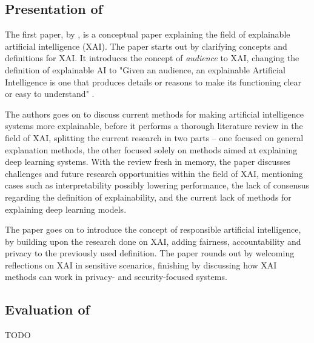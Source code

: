 \subsection[Presentation of Barredo Arrieta et al. (2020)]{Presentation of \textcite{Barredo_2020}}
The first paper,  by \textcite{Barredo_2020}, is a conceptual paper explaining the field of explainable artificial intelligence (XAI). The paper starts out by clarifying concepts and definitions for XAI. It introduces the concept of \textit{audience} to XAI, changing the definition of explainable AI to "Given an audience, an explainable Artificial Intelligence is one that produces details or reasons to make its functioning clear or easy to understand" \parencite[p.85]{Barredo_2020}.

The authors goes on to discuss current methods for making artificial intelligence systems more explainable, before it performs a thorough literature review in the field of XAI, splitting the current research in two parts -- one focused on general explanation methods, the other focused solely on methods aimed at explaining deep learning systems. With the review fresh in memory, the paper discusses challenges and future research opportunities within the field of XAI, mentioning cases such as interpretability possibly lowering performance, the lack of consensus regarding the definition of explainability, and the current lack of methods for explaining deep learning models.

The paper goes on to introduce the concept of responsible artificial intelligence, by building upon the research done on XAI, adding fairness, accountability and privacy to the previously used definition. The paper rounds out by welcoming reflections on XAI in sensitive scenarios, finishing by discussing how XAI methods can work in privacy- and security-focused systems.



\subsection[Evaluation of Barredo Arrieta et al. (2020)]{Evaluation of \textcite{Barredo_2020}}
TODO